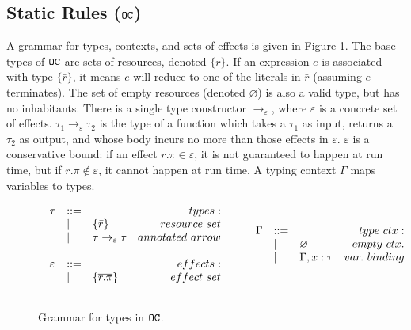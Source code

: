 \subsection{Static Rules ($\mathtt{OC}$)}

A grammar for types, contexts, and sets of effects is given in Figure \ref{fig:opercalc_types}. The base types of $\mathtt{OC}$ are sets of resources, denoted $\{ \bar r\}$. If an expression $e$ is associated with type $\{ \bar r \}$, it means $e$ will reduce to one of the literals in $\bar r$ (assuming $e$ terminates). The set of empty resources (denoted $\varnothing$) is also a valid type, but has no inhabitants. There is a single type constructor $\rightarrow_{\varepsilon}$, where $\varepsilon$ is a concrete set of effects. $\tau_1 \rightarrow_{\varepsilon} \tau_2$ is the type of a function which takes a $\tau_1$ as input, returns a $\tau_2$ as output, and whose body incurs no more than those effects in $\varepsilon$. $\varepsilon$ is a conservative bound: if an effect $r.\pi \in \varepsilon$, it is not guaranteed to happen at run time, but if $r.\pi \notin \varepsilon$, it cannot happen at run time. A typing context $\Gamma$ maps variables to types. 

\begin{figure}[h]
\vspace{-5pt}

\[
\begin{array}{lll}

\begin{array}{lllr}

\tau & ::= & ~ & types: \\
		& | & \{ \bar r \} & resource~set \\
		& | & \tau \rightarrow_{\varepsilon} \tau & annotated~arrow \\ 
		&&\\
		
\varepsilon & ::= & ~ & effects: \\
		& | & \{ \overline{r.\pi} \} & effect~set \\
		&&\\
		
\end{array}

	\hspace{5ex}
    
\begin{array}{lllr}

\Gamma & ::= & ~ & type~ctx: \\
				& | & \varnothing & empty~ctx. \\
				& | & \Gamma, x: \tau & var.~binding \\
				&&\\
\end{array}

\end{array}
\]

\vspace{-7pt}
\caption{Grammar for types in $\mathtt{OC}$.}
\label{fig:opercalc_types}
\end{figure}

